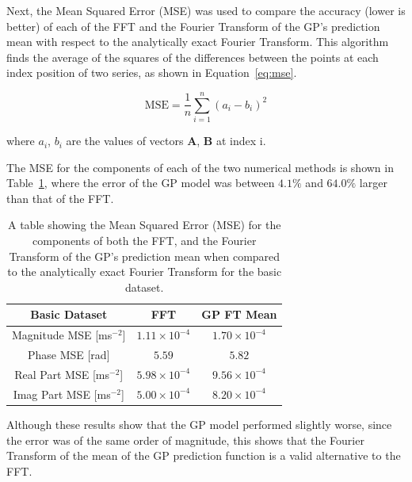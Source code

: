\documentclass[12pt]{article}
\begin{document}
    Next, the Mean Squared Error (MSE) was used to compare the accuracy (lower is better) of each of the FFT and the Fourier Transform of the GP's prediction mean with respect to the analytically exact Fourier Transform.
    This algorithm finds the average of the squares of the differences between the points at each index position of two series, as shown in Equation~\ref{eq:mse}.

    \begin{equation}
        \text{MSE} = \frac{1}{n} \sum_{i=1}^{n} (a_i - b_i)^2 \label{eq:mse}
    \end{equation}

    \noindent where $a_i$, $b_i$ are the values of vectors $\mathbf{A}$, $\mathbf{B}$ at index i.

    The MSE for the components of each of the two numerical methods is shown in Table~\ref{tab:basic-mse}, where the error of the GP model was between $4.1\%$ and $64.0\%$ larger than that of the FFT.

    \begin{table}[h]
        \centering %
        \setlength{\arrayrulewidth}{1pt} %
        \begin{tabular}{|c|c|c|} %
            \hline
            Basic Dataset & FFT & GP FT Mean \\ %
            \hline
            Magnitude MSE [ms$^{-2}$] & $1.11 \times 10^{-4}$ & $1.70 \times 10^{-4}$ \\ %
            \hline
            Phase MSE [rad] & $5.59$ & $5.82$ \\ %
            \hline
            Real Part MSE [ms$^{-2}$] & $5.98 \times 10^{-4}$ & $9.56 \times 10^{-4}$ \\ %
            \hline
            Imag Part MSE [ms$^{-2}$] & $5.00 \times 10^{-4}$ & $8.20 \times 10^{-4}$ \\ %
            \hline
        \end{tabular}
        \caption{A table showing the Mean Squared Error (MSE) for the components of both the FFT, and the Fourier Transform of the GP's prediction mean when compared to the analytically exact Fourier Transform for the basic dataset.}
        \label{tab:basic-mse}
    \end{table}


    Although these results show that the GP model performed slightly worse, since the error was of the same order of magnitude, this shows that the Fourier Transform of the mean of the GP prediction function is a valid alternative to the FFT.
\end{document}
